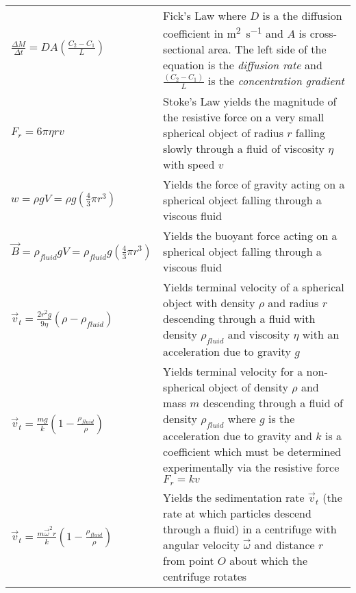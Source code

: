 \begin{longtable}{p{} p{}}
  \(\displaystyle\frac{\Delta M}{\Delta t}=DA\left(\frac{C_2-C_1}{L}\right)\) & Fick's Law where $D$ is a the diffusion coefficient in \si{\meter\squared\per\second} and $A$ is cross-sectional area. The left side of the equation is the \textit{diffusion rate} and $\frac{\left(C_2-C_1\right)}{L}$ is the \textit{concentration gradient} \\
  \(F_r = 6\pi\eta rv\) & Stoke's Law yields the magnitude of the resistive force on a very small spherical object of radius $r$ falling slowly through a fluid of viscosity $\eta$ with speed $v$ \\
  \(w = \rho gV = \rho g\displaystyle\left(\frac{4}{3}\pi r^3\right)\) & Yields the force of gravity acting on a spherical object falling through a viscous fluid \\
  \(\vec{B} = \rho_{fluid}gV = \rho_{fluid}g\displaystyle\left(\frac{4}{3}\pi r^3\right)\) & Yields the buoyant force acting on a spherical object falling through a viscous fluid \\
  \(\vec{v}_t = \displaystyle\frac{2r^2g}{9\eta}\left(\rho-\rho_{fluid}\right)\) & Yields terminal velocity of a spherical object with density $\rho$ and radius $r$ descending through a fluid with density $\rho_{fluid}$ and viscosity $\eta$ with an acceleration due to gravity $g$ \\
  \(\vec{v}_t = \displaystyle\frac{mg}{k}\left(1-\frac{\rho_{fluid}}{\rho}\right)\) & Yields terminal velocity for a non-spherical object of density $\rho$ and mass $m$ descending through a fluid of density $\rho_{fluid}$ where $g$ is the acceleration due to gravity and $k$ is a coefficient which must be determined experimentally via the resistive force $F_r=kv$ \\
  \(\vec{v}_t=\displaystyle\frac{m\vec{\omega}^2r}{k}\left(1-\frac{\rho_{fluid}}{\rho}\right)\) & Yields the sedimentation rate $\vec{v}_t$ (the rate at which particles descend through a fluid) in a centrifuge with angular velocity $\vec{\omega}$ and distance $r$ from point $O$ about which the centrifuge rotates \\
\end{longtable}
